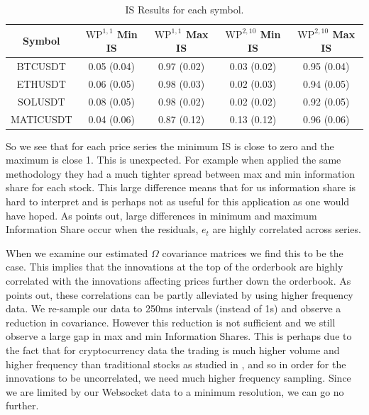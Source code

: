 \documentclass[a4paper, oneside, notitlepage]{book}
\begin{document}
\begin{table}[ht!]
    \begin{center}
        \begin{tabular}{|c|c|c|c|c|}
            \hline
            Symbol    & $\text{WP}^{1,1}$ Min IS & $\text{WP}^{1,1}$ Max IS & $\text{WP}^{2,10}$ Min IS & $\text{WP}^{2,10}$ Max IS \\
            \hline
            BTCUSDT   & 0.05 (0.04)  & 0.97 (0.02)   & 0.03 (0.02) & 0.95 (0.04)   \\
            ETHUSDT   & 0.06 (0.05)  & 0.98 (0.03)   & 0.02 (0.03) & 0.94 (0.05)  \\
            SOLUSDT   & 0.08 (0.05)     & 0.98 (0.02)  & 0.02 (0.02) & 0.92 (0.05)   \\
            MATICUSDT &   0.04 (0.06)    & 0.87 (0.12)  & 0.13 (0.12) & 0.96 (0.06)  \\
            \hline
        \end{tabular}
        \caption{IS Results for each symbol.}
    \label{table:1}
    \end{center}
\end{table}

So we see that for each price series the minimum IS is close to zero and the maximum is close 1.
This is unexpected. For example when \cite{CAO2009} applied the same methodology they
had a much tighter spread between max and min information share for each stock.
This large difference means that for us information share is hard to interpret and 
is perhaps not as useful for this application as one would have hoped.
As \cite{YAN2010} points out, large differences in minimum and maximum Information Share
occur when the residuals, $e_t$ are highly correlated across series.

When we examine our estimated $\Omega$ covariance matrices we find this to be the case.
This implies that the innovations at the top of the orderbook are highly correlated
with the innovations affecting prices further down the orderbook. As \cite{KARABIYIK2022}
points out, these correlations can be partly alleviated by using higher frequency data.
We re-sample our data to 250ms intervals (instead of 1s) and observe a reduction
in covariance. However this reduction is not sufficient and we still observe a large gap in max and min Information Shares.
This is perhaps due to the fact that
for cryptocurrency data the trading is much higher volume and higher frequency
than traditional stocks as studied in \cite{CAO2009}, and so in order for the 
innovations to be uncorrelated, we need much higher frequency sampling.
Since we are limited by our Websocket data to a minimum resolution, we can go no further. 
\end{document}
